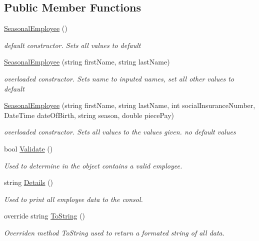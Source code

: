 \subsection*{Public Member Functions}
\begin{DoxyCompactItemize}
\item 
\hyperlink{class_all_employees_1_1_seasonal_employee_a2206a19da96d42cbd56e7fb5d073c7d4}{Seasonal\+Employee} ()
\begin{DoxyCompactList}\small\item\em default constructor. Sets all values to default \end{DoxyCompactList}\item 
\hyperlink{class_all_employees_1_1_seasonal_employee_acc7fb6022faa7594a0e249a8ba89f217}{Seasonal\+Employee} (string first\+Name, string last\+Name)
\begin{DoxyCompactList}\small\item\em overloaded constructor. Sets name to inputed names, set all other values to default \end{DoxyCompactList}\item 
\hyperlink{class_all_employees_1_1_seasonal_employee_aae200d06e4faa2f87698cf4927463b0e}{Seasonal\+Employee} (string first\+Name, string last\+Name, int social\+Insurance\+Number, Date\+Time date\+Of\+Birth, string season, double piece\+Pay)
\begin{DoxyCompactList}\small\item\em overloaded constructor. Sets all values to the values given. no default values \end{DoxyCompactList}\item 
bool \hyperlink{class_all_employees_1_1_seasonal_employee_a70f911ac43a67b84f93ead74860bb6d9}{Validate} ()
\begin{DoxyCompactList}\small\item\em Used to determine in the object contains a valid employee. \end{DoxyCompactList}\item 
string \hyperlink{class_all_employees_1_1_seasonal_employee_a0474e4afe0e11f4e2dd0a523bff3034b}{Details} ()
\begin{DoxyCompactList}\small\item\em Used to print all employee data to the consol. \end{DoxyCompactList}\item 
override string \hyperlink{class_all_employees_1_1_seasonal_employee_a797da83b3ef0a5e7fb04fc5b0d373a11}{To\+String} ()
\begin{DoxyCompactList}\small\item\em Overriden method To\+String used to return a formated string of all data. \end{DoxyCompactList}\item 

\end{DoxyCompactItemize}
